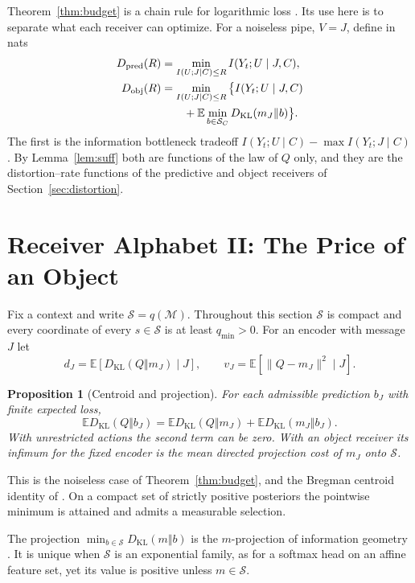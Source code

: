 \documentclass[10pt,journal]{IEEEtran}
\newtheorem{proposition}{Proposition}
\newcommand{\E}{\mathbb E}
\newcommand{\M}{\mathcal M}
\newcommand{\Sset}{\mathcal S}
\newcommand{\KL}{D_{\mathrm{KL}}}
\begin{document}
Theorem~\ref{thm:budget} is a chain rule for logarithmic loss \cite{courtade2014multiterminal}. Its use here is to separate what each receiver can optimize. For a noiseless pipe, $V=J$, define in nats
\begin{align}
 D_{\rm pred}(R)&=\min_{I(U;J|C)\le R} I(Y_t;U\mid J,C),\label{eq:dpred}\\
 D_{\rm obj}(R)&=\min_{I(U;J|C)\le R}\big\{I(Y_t;U\mid J,C)\nonumber\\
 &\qquad+\E\min_{b\in\Sset_C}\KL(m_J\Vert b)\big\}.\label{eq:dobj}
\end{align}
The first is the information bottleneck tradeoff $I(Y_t;U\mid C)-\max I(Y_t;J\mid C)$ \cite{tishby1999information,harremoes2007information}. By Lemma~\ref{lem:suff} both are functions of the law of $Q$ only, and they are the distortion--rate functions of the predictive and object receivers of Section~\ref{sec:distortion}.

\section{Receiver Alphabet II: The Price of an Object}\label{sec:gap}
Fix a context and write $\Sset=q(\M)$. Throughout this section $\Sset$ is compact and every coordinate of every $s\in\Sset$ is at least ${q_{\min}}>0$. For an encoder with message $J$ let
\begin{equation}
 d_J=\E[\KL(Q\Vert m_J)\mid J],\qquad v_J=\E[\|Q-m_J\|^2\mid J].
\end{equation}
\begin{proposition}[Centroid and projection]\label{prop:centroid}
For each admissible prediction $b_J$ with finite expected loss,
\begin{equation}
 \E\KL(Q\Vert b_J)=\E\KL(Q\Vert m_J)+\E\KL(m_J\Vert b_J). \label{eq:centroid}
\end{equation}
With unrestricted actions the second term can be zero. With an object receiver its infimum for the fixed encoder is the mean directed projection cost of $m_J$ onto $\Sset$.
\end{proposition}
\begin{IEEEproof}
This is the noiseless case of Theorem~\ref{thm:budget}, and the Bregman centroid identity of \cite{JMLR:v6:banerjee05b}. On a compact set of strictly positive posteriors the pointwise minimum is attained and admits a measurable selection.
\end{IEEEproof}
The projection $\min_{b\in\Sset}\KL(m\Vert b)$ is the $m$-projection of information geometry \cite{amari2000methods}. It is unique when $\Sset$ is an exponential family, as for a softmax head on an affine feature set, yet its value is positive unless $m\in\Sset$.
\end{document}
